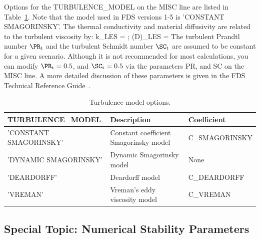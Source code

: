 \documentclass[11pt]{book}
\begin{document}
Options for the {\ct TURBULENCE\_MODEL} on the {\ct MISC} line are listed in Table~\ref{turb_table}. Note that the model used in FDS versions 1-5 is {\ct 'CONSTANT SMAGORINSKY'}. The thermal conductivity and material diffusivity are related to the turbulent viscosity by:
\be
   k_{\hbox{\tiny LES}} = 
   \quad ; \quad  (\rho D)_{\hbox{\tiny LES}} =
\ee
The turbulent Prandtl number $\PR_t$ and the turbulent Schmidt number $\SC_t$ are assumed to be constant for a given scenario. Although it is not recommended for most calculations, you can modify $\PR_{\rm t}=0.5$, and $\SC_{\rm t}=0.5$ via the parameters {\ct PR}, and {\ct SC} on the {\ct MISC} line. A more detailed discussion of these parameters is given in the FDS Technical Reference Guide~\cite{FDS_Math_Guide}.

\begin{table}[ht]
\caption[Turbulence model options]{Turbulence model options.}
\label{turb_table}
\begin{center}
\begin{tabular}{|lll|}
\hline
{\ct TURBULENCE\_MODEL} \hfill  & Description    \hfill                                         & Coefficient   \hfill  \\ \hline
{\ct 'CONSTANT SMAGORINSKY'}    & Constant coefficient Smagorinsky model \cite{Smagorinsky:1}   & {\ct C\_SMAGORINSKY}  \\
{\ct 'DYNAMIC SMAGORINSKY'}     & Dynamic Smagorinsky model \cite{Germano:1991,Moin:1991}       & None                  \\
{\ct 'DEARDORFF'}               & Deardorff model \cite{Deardorff:1980,Pope:2000}               & {\ct C\_DEARDORFF}    \\
{\ct 'VREMAN'}                  & Vreman's eddy viscosity model \cite{Vreman:2004}              & {\ct C\_VREMAN}       \\ \hline
\end{tabular}
\end{center}
\end{table}








\subsection{Special Topic: Numerical Stability Parameters}
\label{info:CFL}
\end{document}
